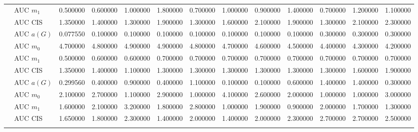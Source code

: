 \begin{table}[htbp]
\begin{tabular}{llrrrrrrrrrrr}
    & AUC $m_1$ & 0.500000 & 0.600000 & 1.000000 & 1.800000 & 0.700000 & 1.000000 & 0.900000 & 1.400000 & 0.700000 & 1.200000 & 1.100000 \\
    & AUC CIS & 1.350000 & 1.400000 & 1.300000 & 1.900000 & 1.300000 & 1.600000 & 2.100000 & 1.900000 & 1.300000 & 2.100000 & 2.300000 \\
    \addlinespace
    \multirow{4}{*}{degree} & AUC $a(G)$ & 0.077550 & 0.100000 & 0.100000 & 0.100000 & 0.100000 & 0.100000 & 0.100000 & 0.100000 & 0.300000 & 0.300000 & 0.300000 \\
    & AUC $m_0$ & 4.700000 & 4.800000 & 4.900000 & 4.900000 & 4.800000 & 4.700000 & 4.600000 & 4.500000 & 4.400000 & 4.300000 & 4.200000 \\
    & AUC $m_1$ & 0.500000 & 0.600000 & 0.600000 & 0.700000 & 0.700000 & 0.700000 & 0.700000 & 0.700000 & 0.700000 & 0.700000 & 0.700000 \\
    & AUC CIS & 1.350000 & 1.400000 & 1.100000 & 1.300000 & 1.300000 & 1.300000 & 1.300000 & 1.300000 & 1.300000 & 1.600000 & 1.900000 \\
    \addlinespace
    \multirow{4}{*}{random} & AUC $a(G)$ & 0.299560 & 0.400000 & 0.900000 & 0.400000 & 1.100000 & 0.100000 & 0.100000 & 0.600000 & 1.400000 & 1.400000 & 0.300000 \\
    & AUC $m_0$ & 2.100000 & 2.700000 & 1.100000 & 2.900000 & 1.000000 & 4.100000 & 2.600000 & 2.000000 & 1.000000 & 1.000000 & 3.000000 \\
    & AUC $m_1$ & 1.600000 & 2.100000 & 3.200000 & 1.800000 & 2.800000 & 1.000000 & 1.900000 & 0.900000 & 2.000000 & 1.700000 & 1.300000 \\
    & AUC CIS & 1.650000 & 1.800000 & 2.300000 & 1.400000 & 2.000000 & 1.400000 & 2.000000 & 2.300000 & 2.700000 & 2.700000 & 2.500000 \\
    \addlinespace
    \bottomrule
  \end{tabular}
\end{table}

